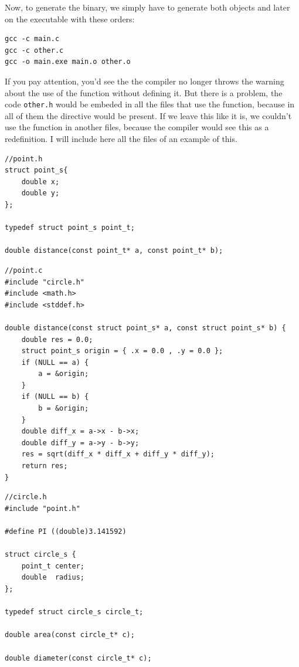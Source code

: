 \documentclass[a4paper]{article}
\begin{document}
Now, to generate the binary, we simply have to generate both objects and later
on the executable with these orders:

\noindent
\begin{minipage}[H]{\linewidth}
\mbox{}
\begin{lstlisting}[style=terminalStyle]
gcc -c main.c
gcc -c other.c
gcc -o main.exe main.o other.o
\end{lstlisting}
\end{minipage}

If you pay attention, you'd see the the compiler no longer throws the warning
about the use of the function without defining it. But there is a problem, the
code \verb!other.h! would be embeded in all the files that use the function,
because in all of them the directive would be present. If we leave this like
it is, we couldn't use the function in another files, because the compiler would
see this as a redefinition. I will include here all the files of an example of
this.
\noindent
\begin{minipage}[H]{\linewidth}
\mbox{}
\begin{lstlisting}[style=C,
caption={Redefinition example -- \texttt{point.h}},
label={lst:redefInclude}]
//point.h
struct point_s{
    double x;
    double y;
};

typedef struct point_s point_t;

double distance(const point_t* a, const point_t* b);
\end{lstlisting}
\end{minipage}
\noindent
\begin{minipage}[H]{\linewidth}
\mbox{}
\begin{lstlisting}[style=C,
caption={Redefinition example -- \texttt{point.c}},
label={lst:redefInclude}]
//point.c
#include "circle.h"
#include <math.h>
#include <stddef.h>

double distance(const struct point_s* a, const struct point_s* b) {
    double res = 0.0;
    struct point_s origin = { .x = 0.0 , .y = 0.0 };
    if (NULL == a) {
        a = &origin;
    }
    if (NULL == b) {
        b = &origin;
    }
    double diff_x = a->x - b->x;
    double diff_y = a->y - b->y;
    res = sqrt(diff_x * diff_x + diff_y * diff_y);
    return res;
}
\end{lstlisting}
\end{minipage}
\noindent
\begin{minipage}[H]{\linewidth}
\mbox{}
\begin{lstlisting}[style=C,
caption={Redefinition example -- \texttt{circle.h}},
label={lst:redefInclude}]
//circle.h
#include "point.h"

#define PI ((double)3.141592)

struct circle_s {
    point_t center;
    double  radius;
};

typedef struct circle_s circle_t;

double area(const circle_t* c);

double diameter(const circle_t* c);
\end{lstlisting}
\end{minipage}
\end{document}
